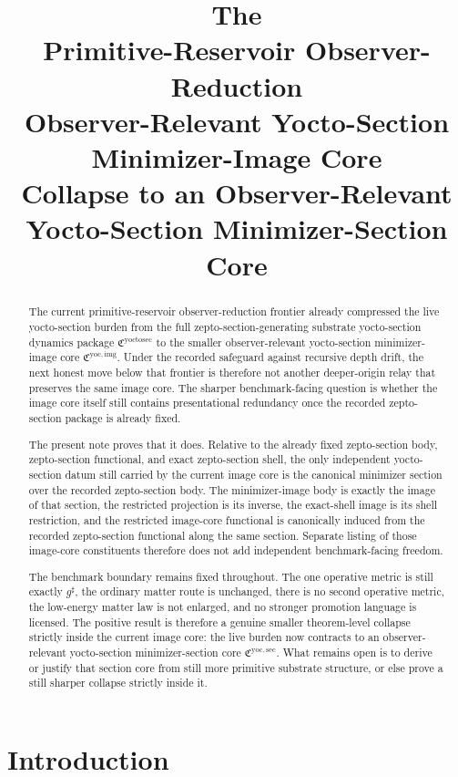 \documentclass[11pt]{article}
\title{\textbf{The \TheoryName{}}\\[0.4em]
\large Primitive-Reservoir Observer-Reduction\\
\large Observer-Relevant Yocto-Section Minimizer-Image Core\\
\large Collapse to an Observer-Relevant Yocto-Section Minimizer-Section Core}
\author{}
\date{}
\newcommand{\CompletedMetric}{g^{\sharp}}
\newcommand{\YoctoSectionPackage}{\mathfrak C^{\mathrm{yoctosec}}}
\newcommand{\YoctoImageCore}{\mathfrak C^{\mathrm{yoc,img}}}
\newcommand{\YoctoMinSectionCore}{\mathfrak C^{\mathrm{yoc,sec}}}
\begin{document}
\maketitle

\begin{abstract}
The current primitive-reservoir observer-reduction frontier already compressed the live yocto-section burden from the full zepto-section-generating substrate yocto-section dynamics package \(\YoctoSectionPackage\) to the smaller observer-relevant yocto-section minimizer-image core \(\YoctoImageCore\). Under the recorded safeguard against recursive depth drift, the next honest move below that frontier is therefore not another deeper-origin relay that preserves the same image core. The sharper benchmark-facing question is whether the image core itself still contains presentational redundancy once the recorded zepto-section package is already fixed.

The present note proves that it does. Relative to the already fixed zepto-section body, zepto-section functional, and exact zepto-section shell, the only independent yocto-section datum still carried by the current image core is the canonical minimizer section over the recorded zepto-section body. The minimizer-image body is exactly the image of that section, the restricted projection is its inverse, the exact-shell image is its shell restriction, and the restricted image-core functional is canonically induced from the recorded zepto-section functional along the same section. Separate listing of those image-core constituents therefore does not add independent benchmark-facing freedom.

The benchmark boundary remains fixed throughout. The one operative metric is still exactly \(\CompletedMetric\), the ordinary matter route is unchanged, there is no second operative metric, the low-energy matter law is not enlarged, and no stronger promotion language is licensed. The positive result is therefore a genuine smaller theorem-level collapse strictly inside the current image core: the live burden now contracts to an observer-relevant yocto-section minimizer-section core \(\YoctoMinSectionCore\). What remains open is to derive or justify that section core from still more primitive substrate structure, or else prove a still sharper collapse strictly inside it.
\end{abstract}

\section{Introduction}
\end{document}
